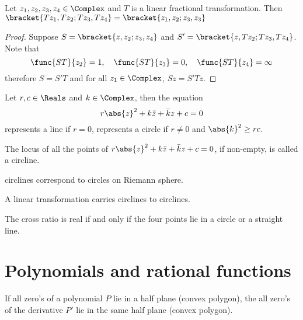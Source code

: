\begin{proposition}
    Let \(z_1,z_2,z_3,z_4 \in \Complex\) and \(T\) is a linear fractional transformation. Then \(\bracket{Tz_1, Tz_2; Tz_3, Tz_4} = \bracket{z_1, z_2; z_3, z_3}\)
\end{proposition}
\begin{proof}
    Suppose \(S = \bracket{z, z_2; z_3, z_4}\) and \(S' = \bracket{z, Tz_2; Tz_3, Tz_4}\). Note that 
    \begin{equation*}
        \func{ST}{z_2} = 1 , \quad \func{ST}{z_3} = 0 , \quad \func{ST}{z_4} = \infty
    \end{equation*}
    therefore \(S = S'T\) and for all \(z_1 \in \Complex\), \(Sz = S'Tz\).
\end{proof}

\begin{proposition}
    Let \(r,c \in \Reals\) and \(k \in \Complex\), then the equation 
    \begin{equation*}
        r\abs{z}^2 + k\bar{z} + \bar{k}z + c = 0
    \end{equation*}
    represents a line if \(r = 0\), represents a circle if \(r \neq 0\) and \(\abs{k}^2 \geq rc\).
\end{proposition}

The locus of all the points of \(r\abs{z}^2 + k\bar{z} + \bar{k}z + c = 0\), if non-empty, is called a circline.
\begin{proposition}
    circlines correspond to circles on Riemann sphere.
\end{proposition}

\begin{proposition}
    A linear transformation carries circlines to circlines.
\end{proposition}

\begin{proposition}
    The cross ratio is real if and only if the four points lie in a circle or a straight line.
\end{proposition}



\section{Polynomials and rational functions}

\begin{theorem}
      If all zero's of a polynomial \(P\) lie in a half plane (convex polygon), the all zero's of the derivative \(P'\) lie in the same half plane (convex polygon).
\end{theorem}


